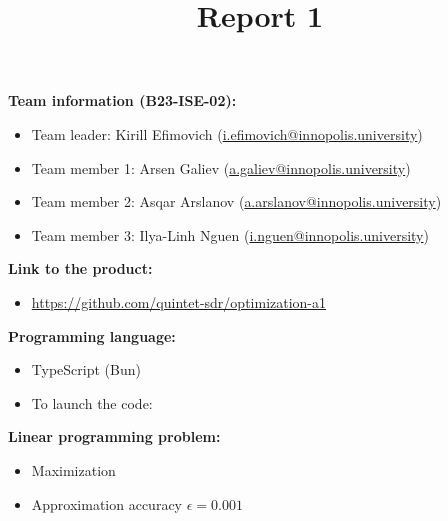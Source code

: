 \documentclass{article}
\title{\textbf{Report 1}}
\author{}
\date{}
\begin{document}
\maketitle

\thispagestyle{fancy}

\textbf{Team information (B23-ISE-02):}
\begin{itemize}[label=-]
    \item Team leader: Kirill Efimovich (\href{mailto:k.efimovich@innopolis.university}{i.efimovich@innopolis.university})
    \item Team member 1: Arsen Galiev (\href{mailto:a.galiev@innopolis.university}{a.galiev@innopolis.university})
    \item Team member 2: Asqar Arslanov (\href{mailto:a.arslanov@innopolis.university}{a.arslanov@innopolis.university})
    \item Team member 3: Ilya-Linh Nguen (\href{mailto:i.nguen@innopolis.university}{i.nguen@innopolis.university})
\end{itemize}

\textbf{Link to the product:}
\begin{itemize}[label=-]
    \item \url{https://github.com/quintet-sdr/optimization-a1}
\end{itemize}

\textbf{Programming language:}
\begin{itemize}[label=-]
    \item TypeScript (Bun)
    \item To launch the code: 
\end{itemize}

\textbf{Linear programming problem:}
\begin{itemize}[label=-]
    \item Maximization
    \item Approximation accuracy \(\epsilon = 0.001\)
\end{itemize}
\end{document}
